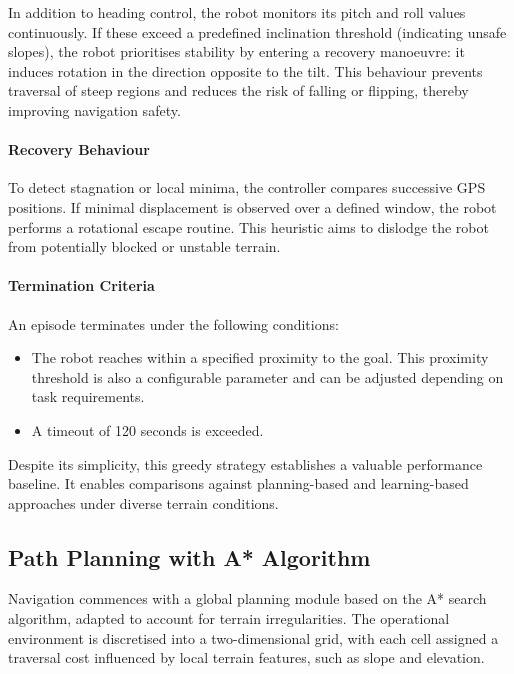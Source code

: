 \documentclass[conference]{IEEEtran}
\begin{document}
In addition to heading control, the robot monitors its pitch and roll values continuously. If these exceed a predefined inclination threshold (indicating unsafe slopes), the robot prioritises stability by entering a recovery manoeuvre: it induces rotation in the direction opposite to the tilt. This behaviour prevents traversal of steep regions and reduces the risk of falling or flipping, thereby improving navigation safety.

\paragraph{Recovery Behaviour}

To detect stagnation or local minima, the controller compares successive GPS positions. If minimal displacement is observed over a defined window, the robot performs a rotational escape routine. This heuristic aims to dislodge the robot from potentially blocked or unstable terrain.

\paragraph{Termination Criteria}

An episode terminates under the following conditions:

\begin{itemize}
    \item The robot reaches within a specified proximity to the goal. This proximity threshold is also a configurable parameter and can be adjusted depending on task requirements.
    \item A timeout of 120 seconds is exceeded.
\end{itemize}

Despite its simplicity, this greedy strategy establishes a valuable performance baseline. It enables comparisons against planning-based and learning-based approaches under diverse terrain conditions.

\subsection{Path Planning with A* Algorithm}

Navigation commences with a global planning module based on the A* search algorithm, adapted to account for terrain irregularities. The operational environment is discretised into a two-dimensional grid, with each cell assigned a traversal cost influenced by local terrain features, such as slope and elevation.
\end{document}
